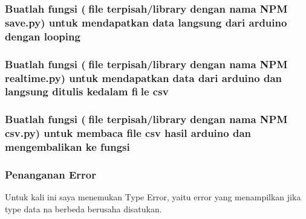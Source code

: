 \subsubsection{Buatlah fungsi (file terpisah/library dengan nama NPM save.py) untuk mendapatkan data langsung dari arduino dengan looping}


\subsubsection{Buatlah fungsi (file terpisah/library dengan nama NPM realtime.py) untuk mendapatkan data dari arduino dan langsung ditulis kedalam file csv}


\subsubsection{Buatlah fungsi (file terpisah/library dengan nama NPM csv.py) untuk membaca file csv hasil arduino dan mengembalikan ke fungsi}


\subsubsection{Penanganan Error}
Untuk kali ini saya menemukan Type Error, yaitu error yang menampilkan jika type data na berbeda berusaha disatukan.
